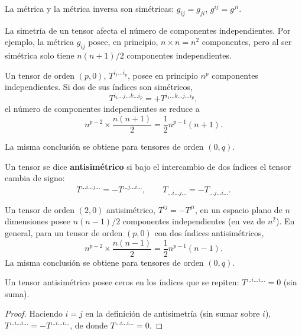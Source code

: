 \begin{ejemplo}
La métrica y la métrica inversa son simétricas: $g_{ij}=g_{ji}$,
$g^{ij}=g^{ji}$.
\end{ejemplo}

\begin{observacion}
La simetría de un tensor afecta el número de componentes independientes.
Por ejemplo, la métrica $g_{ij}$ posee, en principio, $n\times n=n^2$
componentes, pero al ser simétrica solo tiene $n(n+1)/2$ componentes
independientes.
\end{observacion}

\begin{proposicionc}
Un tensor de orden $(p,0)$, $T^{i_1\dots i_p}$, posee en principio $n^p$
componentes independientes. Si dos de sus índices son simétricos,
\[
T^{i_1\dots j\dots k\dots i_p} = +T^{i_1\dots k\dots j\dots i_p},
\]
el número de componentes independientes se reduce a
\[
n^{p-2}\times \frac{n(n+1)}{2} = \frac{1}{2}n^{p-1}(n+1).
\]
\end{proposicionc}

La misma conclusión se obtiene para tensores de orden $(0,q)$.

\begin{definicion}
Un tensor se dice \textbf{antisimétrico} si bajo el intercambio de dos
índices el tensor cambia de signo:
\[
T^{\dots i\dots j\dots} = -T^{\dots j\dots i\dots}, \qquad T_{\dots
i\dots j\dots} = -T_{\dots j\dots i\dots}.
\]
\end{definicion}

\begin{proposicionc}
Un tensor de orden $(2,0)$ antisimétrico, $T^{ij}=-T^{ji}$, en un espacio
plano de $n$ dimensiones posee $n(n-1)/2$ componentes independientes (en
vez de $n^2$). En general, para un tensor de orden $(p,0)$ con dos
índices antisimétricos,
\[
n^{p-2}\times\frac{n(n-1)}{2} = \frac{1}{2}n^{p-1}(n-1).
\]
La misma conclusión se obtiene para tensores de orden $(0,q)$.
\end{proposicionc}

\begin{proposicionc}
Un tensor antisimétrico posee ceros en los índices que se repiten:
$T^{\dots i\dots i\dots}=0$ (sin suma).
\end{proposicionc}

\begin{proof}
Haciendo $i=j$ en la definición de antisimetría (sin sumar sobre $i$),
$T^{\dots i\dots i\dots} = -T^{\dots i\dots i\dots}$, de donde
$T^{\dots i\dots i\dots}=0$. \qedhere
\end{proof}


